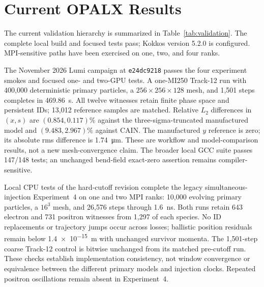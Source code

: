 \documentclass[11pt,a4paper]{article}
\newcommand{\code}[1]{\texttt{#1}}
\begin{document}
\section{Current OPALX Results}

The current validation hierarchy is summarized in
Table~\ref{tab:validation}.  The complete local build and focused tests pass;
Kokkos version 5.2.0 is configured.  MPI-sensitive paths have been exercised
on one, two, and four ranks.

The November 2026 Lumi campaign at \code{e24dc9218} passes the four experiment
smokes and focused one- and two-GPU tests.  A one-MI250 Track-12 run with
400,000 deterministic primary particles, a $256\times256\times128$ mesh,
and 1,501 steps completes in \SI{469.86}{\second}.  All twelve witnesses retain
finite phase space and persistent IDs; 13,012 reference samples are matched.
Relative $L_2$ differences in $(x,s)$ are $(0.854,0.117)\%$ against the
three-sigma-truncated manufactured model and $(9.483,2.967)\%$ against CAIN.
The manufactured $y$ reference is zero; its absolute rms difference is
\SI{1.74}{\micro\metre}.  These are workflow and model-comparison results,
not a new mesh-convergence claim.  The broader local GCC suite passes 147/148
tests; an unchanged bend-field exact-zero assertion remains compiler-sensitive.

Local CPU tests of the hard-cutoff revision complete the legacy
simultaneous-injection Experiment~4 on one and two MPI ranks: 10,000 evolving
primary particles, a $16^3$ mesh, and 26,576 steps through \SI{1.6}{\nano\second}.
Both runs retain 643 electron and 731 positron witnesses from 1,297 of each
species.  No ID replacements or trajectory jumps occur across losses;
ballistic position residuals remain below \SI{1.4e-15}{\metre} with unchanged
survivor momenta.  The 1,501-step coarse Track-12 control is bitwise unchanged
from its matched pre-cutoff run.  These checks establish implementation
consistency, not window convergence or equivalence between the different
primary models and injection clocks.  Repeated positron oscillations remain
absent in Experiment~4.
\end{document}
